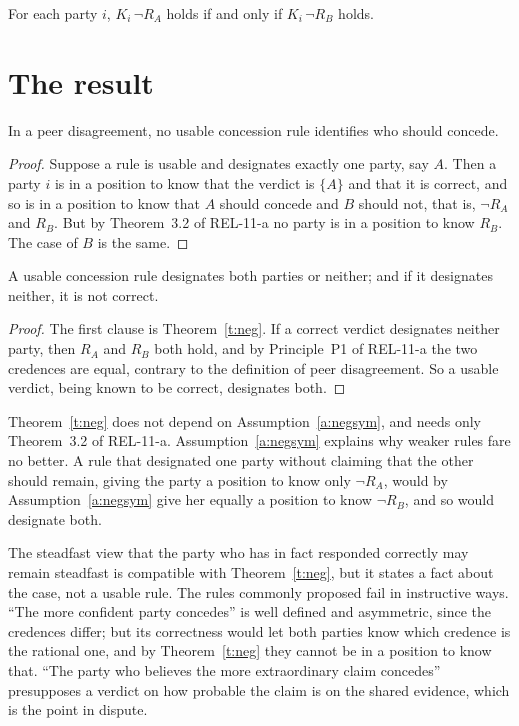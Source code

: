 \documentclass{situationist-preprint}
\begin{document}
\begin{assumption}\label{a:negsym}
For each party $i$, $K_i\,\neg R_A$ holds if and only if $K_i\,\neg R_B$ holds.
\end{assumption}

\section{The result}

\begin{theorem}\label{t:neg}
In a peer disagreement, no usable concession rule identifies who should concede.
\end{theorem}

\begin{proof}
Suppose a rule is usable and designates exactly one party, say $A$. Then a party $i$ is in a position to know that the verdict is $\{A\}$ and that it is correct, and so is in a position to know that $A$ should concede and $B$ should not, that is, $\neg R_A$ and $R_B$. But by Theorem~3.2 of REL-11-a no party is in a position to know $R_B$. The case of $B$ is the same.
\end{proof}

\begin{corollary}\label{c:both}
A usable concession rule designates both parties or neither; and if it designates neither, it is not correct.
\end{corollary}

\begin{proof}
The first clause is Theorem~\ref{t:neg}. If a correct verdict designates neither party, then $R_A$ and $R_B$ both hold, and by Principle~P1 of REL-11-a the two credences are equal, contrary to the definition of peer disagreement. So a usable verdict, being known to be correct, designates both.
\end{proof}

Theorem~\ref{t:neg} does not depend on Assumption~\ref{a:negsym}, and needs only Theorem~3.2 of REL-11-a. Assumption~\ref{a:negsym} explains why weaker rules fare no better. A rule that designated one party without claiming that the other should remain, giving the party a position to know only $\neg R_A$, would by Assumption~\ref{a:negsym} give her equally a position to know $\neg R_B$, and so would designate both.

The steadfast view that the party who has in fact responded correctly may remain steadfast \citep{Kelly2005} is compatible with Theorem~\ref{t:neg}, but it states a fact about the case, not a usable rule. The rules commonly proposed fail in instructive ways. \enquote{The more confident party concedes} is well defined and asymmetric, since the credences differ; but its correctness would let both parties know which credence is the rational one, and by Theorem~\ref{t:neg} they cannot be in a position to know that. \enquote{The party who believes the more extraordinary claim concedes} presupposes a verdict on how probable the claim is on the shared evidence, which is the point in dispute.
\end{document}
